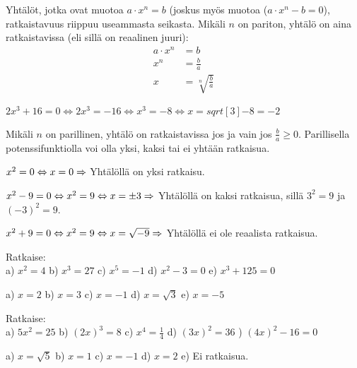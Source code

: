 
Yhtälöt, jotka ovat muotoa $a\cdot x^n = b$ (joskus myös muotoa ($a\cdot x^n - b = 0$), ratkaistavuus riippuu useammasta seikasta. Mikäli $n$ on pariton, yhtälö on aina ratkaistavissa (eli sillä on reaalinen juuri):
\begin{align*}
a\cdot x^n &= b \\
x^n &= \frac{b}{a} \\
x &= \sqrt[n]{\frac{b}{a}}
\end{align*}

\begin{esimerkki}
$2x^3 + 16 = 0 \Leftrightarrow 2x^3 = -16 \Leftrightarrow x^3 = -8  \Leftrightarrow x = sqrt[3]{-8} = -2 $
\end{esimerkki}

Mikäli $n$ on parillinen, yhtälö on ratkaistavissa jos ja vain jos $\frac{b}{a} \geq 0 $. Parillisella potenssifunktiolla voi olla yksi, kaksi tai ei yhtään ratkaisua.

\begin{esimerkki}
$x^2 = 0 \Leftrightarrow x = 0 \\
\Rightarrow$ Yhtälöllä on yksi ratkaisu.
\end{esimerkki}

\begin{esimerkki}
$x^2 - 9 = 0 \Leftrightarrow x^2 = 9 \Leftrightarrow x = \pm 3 \\
\Rightarrow$ Yhtälöllä on kaksi ratkaisua, sillä $3^2 = 9$ ja $(-3)^2 = 9$.
\end{esimerkki}

\begin{esimerkki}
$x^2 + 9 = 0 \Leftrightarrow x^2 = 9 \Leftrightarrow x = \sqrt{-9} \\
\Rightarrow$ Yhtälöllä ei ole reaalista ratkaisua.
\end{esimerkki}

\begin{tehtava}
Ratkaise: \\
a) $ x^2 = 4 $ \qquad
b) $ x^3 = 27 $ \qquad
c) $ x^5 = -1 $ \qquad
d) $ x^2 - 3 = 0 $ \qquad
e) $ x^3 + 125 = 0 $
\begin{vastaus}
a) $ x = 2 $ \qquad
b) $ x = 3 $ \qquad
c) $ x = -1 $ \qquad
d) $ x = \sqrt{3} $ \qquad
e) $ x = -5 $ 
\end{vastaus}
\end{tehtava}

\begin{tehtava}
Ratkaise: \\
a) $ 5x^2 = 25 $ \qquad
b) $ (2x)^3 = 8 $ \qquad
c) $ x^4 = \frac{1}{4} $ \qquad
d) $ (3x)^2 = 36 $ ) $ (4x)^2 - 16 = 0 $ 
\begin{vastaus}
a) $ x = \sqrt{5} $ \qquad
b) $ x = 1 $ \qquad
c) $ x = -1 $ \qquad
d) $ x = 2 $ \qquad
e) Ei ratkaisua. 
\end{vastaus}
\end{tehtava}